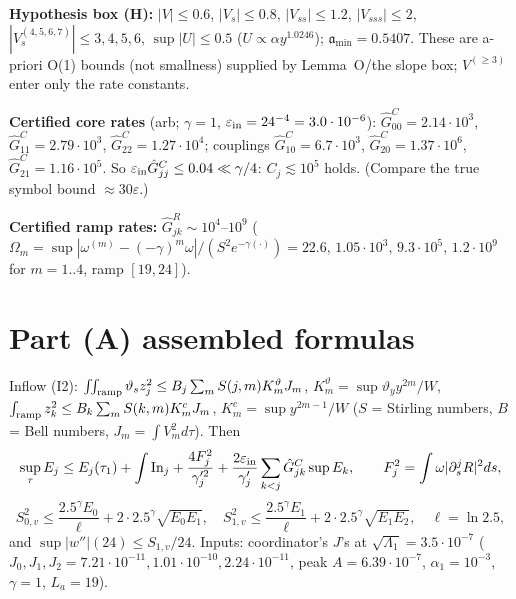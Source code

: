 \documentclass[11pt]{article}
\begin{document}
\textbf{Hypothesis box (H):} $|V|\le0.6$, $|V_s|\le0.8$, $|V_{ss}|\le1.2$, $|V_{sss}|\le2$, $|V^{(4,5,6,7)}_s|\le3,4,5,6$, $\sup|U|\le0.5$ ($U\propto\alpha y^{1.0246}$); $\mathfrak a_{\min}=0.5407$. These are a-priori O(1) bounds (not smallness) supplied by Lemma~O/the slope box; $V^{(\ge3)}$ enter only the rate constants.

\textbf{Certified core rates} (arb; $\gamma=1$, $\varepsilon_{\rm in}=24^{-4}=3.0\cdot10^{-6}$): $\hat G^C_{00}=2.14\cdot10^3$, $\hat G^C_{11}=2.79\cdot10^3$, $\hat G^C_{22}=1.27\cdot10^4$; couplings $\hat G^C_{10}=6.7\cdot10^3$, $\hat G^C_{20}=1.37\cdot10^6$, $\hat G^C_{21}=1.16\cdot10^5$. So $\varepsilon_{\rm in}\hat G^C_{jj}\le0.04\ll\gamma/4$: $C_j\lesssim10^5$ holds. (Compare the true symbol bound $\approx30\varepsilon$.)

\textbf{Certified ramp rates:} $\hat G^R_{jk}\sim10^4$--$10^9$ ($\Omega_m=\sup|\omega^{(m)}-(-\gamma)^m\omega|/(S^2e^{-\gamma(\cdot)})=22.6,\,1.05\!\cdot\!10^3,\,9.3\!\cdot\!10^5,\,1.2\!\cdot\!10^9$ for $m=1..4$, ramp $[19,24]$).

\section{Part (A) assembled formulas}
Inflow (I2): $\int\!\!\int_{\rm ramp}\vartheta_sz_j^2\le B_j\sum_mS(j,m)K^\vartheta_mJ_m$, $K^\vartheta_m=\sup\vartheta_yy^{2m}/W$, $\int_{\rm ramp}z_k^2\le B_k\sum_mS(k,m)K^c_mJ_m$, $K^c_m=\sup y^{2m-1}/W$ ($S$ = Stirling numbers, $B$ = Bell numbers, $J_m=\int V_m^2d\tau$). Then
$$\sup_\tau E_j\le E_j(\tau_1)+\int{\rm In}_j+\frac{4F_j^2}{\gamma_j'^2}+\frac{2\varepsilon_{\rm in}}{\gamma'_j}\sum_{k<j}\hat G^C_{jk}\sup E_k,\qquad F_j^2=\int\omega|\partial_s^jR|^2ds,$$
$$S_{0,v}^2\le \frac{2.5^\gamma E_0}{\ell}+2\cdot2.5^\gamma\sqrt{E_0E_1},\quad S_{1,v}^2\le\frac{2.5^\gamma E_1}{\ell}+2\cdot2.5^\gamma\sqrt{E_1E_2},\quad \ell=\ln2.5,$$
and $\sup|w''|(24)\le S_{1,v}/24$. Inputs: coordinator's $J$'s at $\sqrt{\Lambda_1}=3.5\cdot10^{-7}$ ($J_0,J_1,J_2=7.21\cdot10^{-11},1.01\cdot10^{-10},2.24\cdot10^{-11}$, peak $A=6.39\cdot10^{-7}$, $\alpha_1=10^{-3}$, $\gamma=1$, $L_a=19$).
\end{document}
